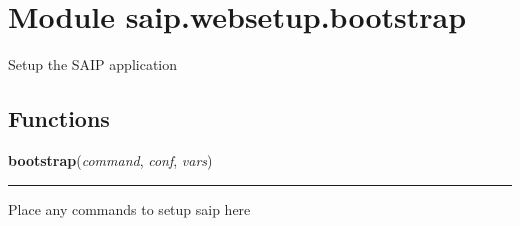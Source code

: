 %
%
%


\section{Module saip.websetup.bootstrap}

    \label{saip:websetup:bootstrap}
Setup the SAIP application



  \subsection{Functions}

    \label{saip:websetup:bootstrap:bootstrap}

    \vspace{0.5ex}

\hspace{.8\funcindent}\begin{boxedminipage}{\funcwidth}

    \raggedright \textbf{bootstrap}(\textit{command}, \textit{conf}, \textit{vars})

    \vspace{-1.5ex}

    \rule{\textwidth}{0.5\fboxrule}
\setlength{\parskip}{2ex}
    Place any commands to setup saip here

\setlength{\parskip}{1ex}
    \end{boxedminipage}

